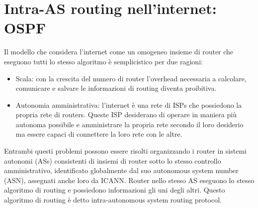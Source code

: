 \section{Intra-AS routing nell'internet: OSPF}
Il modello che considera l'internet come un omogeneo insieme di router che eseguono tutti lo stesso algoritmo \`e semplicistico per due ragioni:
\begin{itemize}
\item Scala: con la crescita del numero di router l'overhead necessaria a calcolare, comunicare e salvare le informazioni di routing diventa proibitiva. 
\item Autonomia amministrativa: l'internet \`e una rete di ISPs che possiedono la propria rete di routers. Queste ISP desiderano di operare in maniera pi\`u
autonoma possibile e amministrare la propria rete secondo il loro desiderio ma essere capaci di connettere la loro rete con le altre.
\end{itemize}
Entrambi questi problemi possono essere risolti organizzando i router in sistemi autonomi (ASs) consistenti di insiemi di router sotto lo stesso controllo
amministrativo, identificato globalmente dal suo autonomous system number (ASN), assegnati anche loro da ICANN. Router nello stesso AS eseguono lo stesso 
algoritmo di routing e possiedono informazioni gli uni degli altri. Questo algoritmo di routing \`e detto intra-autonomous system routing protocol. 

